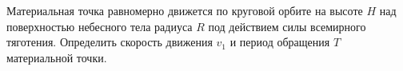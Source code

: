 Материальная точка равномерно движется по круговой орбите на высоте $H$ над поверхностью небесного тела радиуса $R$ под действием силы всемирного тяготения. Определить скорость движения $v_1$ и период обращения $T$ материальной точки.
